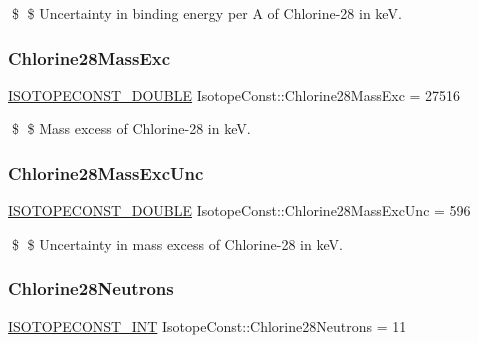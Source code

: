 \$ \$ Uncertainty in binding energy per A of Chlorine-\/28 in keV. \mbox{\label{group___isotope_const-_chlorine-_cl28_ga8b29e66a5eacaa6d7d0f491bad86bafd}} 
\subsubsection{\texorpdfstring{Chlorine28\+Mass\+Exc}{Chlorine28MassExc}}
{\footnotesize\ttfamily \mbox{\hyperlink{group___isotope_const-_macros_ga8f45a7272ce02c0b4c65c44636ed719a}{I\+S\+O\+T\+O\+P\+E\+C\+O\+N\+S\+T\+\_\+\+D\+O\+U\+B\+LE}} Isotope\+Const\+::\+Chlorine28\+Mass\+Exc = 27516}

\$ \$ Mass excess of Chlorine-\/28 in keV. \mbox{\label{group___isotope_const-_chlorine-_cl28_gab68743feccea714c55943d023df556cc}} 
\subsubsection{\texorpdfstring{Chlorine28\+Mass\+Exc\+Unc}{Chlorine28MassExcUnc}}
{\footnotesize\ttfamily \mbox{\hyperlink{group___isotope_const-_macros_ga8f45a7272ce02c0b4c65c44636ed719a}{I\+S\+O\+T\+O\+P\+E\+C\+O\+N\+S\+T\+\_\+\+D\+O\+U\+B\+LE}} Isotope\+Const\+::\+Chlorine28\+Mass\+Exc\+Unc = 596}

\$ \$ Uncertainty in mass excess of Chlorine-\/28 in keV. \mbox{\label{group___isotope_const-_chlorine-_cl28_gada80c2703ec9fc363c54215670745b89}} 
\subsubsection{\texorpdfstring{Chlorine28\+Neutrons}{Chlorine28Neutrons}}
{\footnotesize\ttfamily \mbox{\hyperlink{group___isotope_const-_macros_ga5f18360b3e99483a35c32d789e62621c}{I\+S\+O\+T\+O\+P\+E\+C\+O\+N\+S\+T\+\_\+\+I\+NT}} Isotope\+Const\+::\+Chlorine28\+Neutrons = 11}

